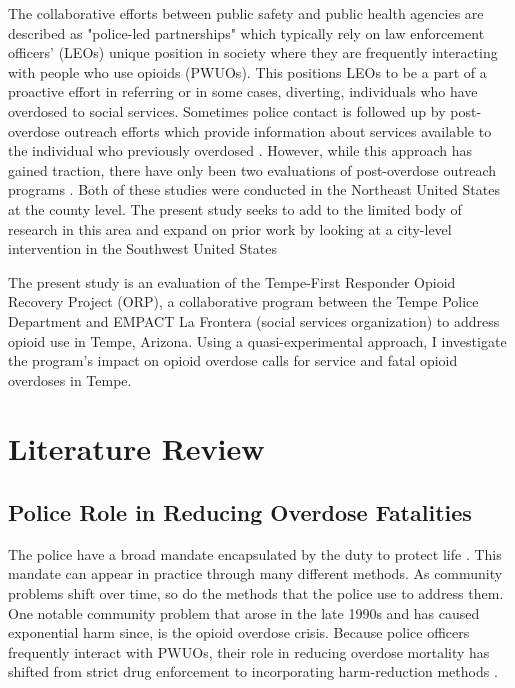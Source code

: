 The collaborative efforts between public safety and public health agencies are described as "police-led partnerships" which typically rely on law enforcement officers' (LEOs) unique position in society where they are frequently interacting with people who use opioids (PWUOs). This positions LEOs to be a part of a proactive effort in referring or in some cases, diverting, individuals who have overdosed to social services. Sometimes police contact is followed up by post-overdose outreach efforts which provide information about services available to the individual who previously overdosed \parencite{formica_characteristics_2021}. However, while this approach has gained traction, there have only been two evaluations of post-overdose outreach programs \parencite{donnelly_law_2022, xuan_association_2023}. Both of these studies were conducted in the Northeast United States at the county level. The present study seeks to add to the limited body of research in this area and expand on prior work by looking at a city-level intervention in the Southwest United States

The present study is an evaluation of the Tempe-First Responder Opioid Recovery Project (ORP), a collaborative program between the Tempe Police Department and EMPACT La Frontera (social services organization) to address opioid use in Tempe, Arizona. Using a quasi-experimental approach, I investigate the program's impact on opioid overdose calls for service and fatal opioid overdoses in Tempe. 

\section{\centering Literature Review}
\subsection{Police Role in Reducing Overdose Fatalities}

The police have a broad mandate encapsulated by the duty to protect life \parencite{skolnick_above_1993}. This mandate can appear in practice through many different methods. As community problems shift over time, so do the methods that the police use to address them. One notable community problem that arose in the late 1990s and has caused exponential harm since, is the opioid overdose crisis. Because police officers frequently interact with PWUOs, their role in reducing overdose mortality has shifted from strict drug enforcement to incorporating harm-reduction methods \parencite{beckett_uses_2016}.

